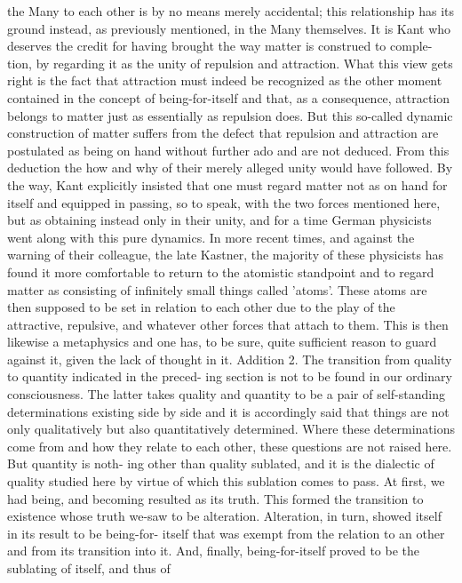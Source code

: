the Many to each other is by no means merely accidental; this relationship has
its ground instead, as previously mentioned, in the Many themselves. It is Kant
who deserves the credit for having brought the way matter is construed to comple-
tion, by regarding it as the unity of repulsion and attraction. What this view gets
right is the fact that attraction must indeed be recognized as the other moment
contained in the concept of being-for-itself and that, as a consequence, attraction
belongs to matter just as essentially as repulsion does. But this so-called dynamic
construction of matter suffers from the defect that repulsion and attraction are
postulated as being on hand without further ado and are not deduced. From this
deduction the how and why of their merely alleged unity would have followed. By
the way, Kant explicitly insisted that one must regard matter not as on hand for
itself and equipped in passing, so to speak, with the two forces mentioned here,
but as obtaining instead only in their unity, and for a time German physicists went
along with this pure dynamics. In more recent times, and against the warning
of their colleague, the late Kastner, the majority of these physicists has found it
more comfortable to return to the atomistic standpoint and to regard matter as
consisting of infinitely small things called 'atoms'. These atoms are then supposed
to be set in relation to each other due to the play of the attractive, repulsive, and
whatever other forces that attach to them. This is then likewise a metaphysics and
one has, to be sure, quite sufficient reason to guard against it, given the lack of
thought in it.
Addition 2. The transition from quality to quantity indicated in the preced-
ing section is not to be found in our ordinary consciousness. The latter takes
quality and quantity to be a pair of self-standing determinations existing side
by side and it is accordingly said that things are not only qualitatively but also
quantitatively determined. Where these determinations come from and how they
relate to each other, these questions are not raised here. But quantity is noth-
ing other than quality sublated, and it is the dialectic of quality studied here by
virtue of which this sublation comes to pass. At first, we had being, and becoming
resulted as its truth. This formed the transition to existence whose truth we-saw
to be alteration. Alteration, in turn, showed itself in its result to be being-for-
itself that was exempt from the relation to an other and from its transition into
it. And, finally, being-for-itself proved to be the sublating of itself, and thus of
